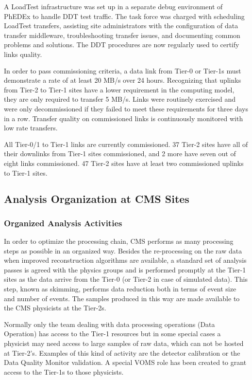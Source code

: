 A LoadTest infrastructure was set up in a separate debug environment of PhEDEx
to handle DDT test traffic.
The task force was charged with scheduling LoadTest transfers, assisting site
administrators with the configuration of data transfer middleware,
troubleshooting transfer issues, and documenting common problems and solutions.
The DDT procedures are now regularly used to certify links quality.

In order to pass commissioning criteria, a data link from Tier-0 or Tier-1s must
demonstrate a rate of at least 20 MB/s over 24 hours. Recognizing that uplinks
from Tier-2 to Tier-1 sites have a lower requirement in the computing model,
they are only required to transfer 5 MB/s. Links were routinely exercised and
were only decommissioned if they failed to meet these requirements for three
days in a row. Transfer quality on commissioned links is continuously monitored
with low rate transfers.

All Tier-0/1 to Tier-1 links are currently commissioned. 37 Tier-2 sites have
all of their downlinks from Tier-1 sites commissioned, and 2 more have seven out
of eight links commissioned. 47 Tier-2 sites have at least two commissioned
uplinks to Tier-1 sites.

\subsection{Analysis Organization at CMS Sites}
\label{sec:4_3}
\subsubsection{ Organized Analysis Activities }
\label{sec:4_3_1}
In order to optimize the processing chain, CMS performs as many processing
steps as possible in an organized way. 
Besides the re-processing %
on the raw data when improved reconstruction algorithms are available,
a standard set of analysis passes is agreed with the physics groups
and is performed promptly at the Tier-1 sites 
as the data arrive from the Tier-0 (or Tier-2 in case of simulated data). 
This step, known as skimming, performs data reduction both
in terms of event size and number of events. 
The samples produced in this way are made available
to the CMS physicists at the Tier-2s. %

Normally only the team dealing with data processing operations (Data Operation)
has access to the Tier-1 resources but in some special cases
a physicist may need access to large samples of raw data,
which can not be hosted at Tier-2's.
Examples of this kind of activity are the detector 
calibration or the Data Quality Monitor validation.
A special VOMS role has been created to grant access
to the Tier-1s to those physicists. 

